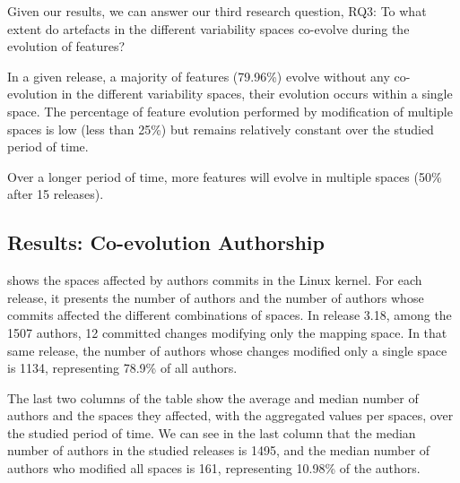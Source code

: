 Given our results, we can answer our third research question, RQ3: 
To what extent do artefacts in the different variability spaces co-evolve during the evolution of features?
\begin{framed}
In a given release, a majority of features  (79.96\%) evolve without any co-evolution in the different variability spaces, their evolution occurs within a single space.
The percentage of feature evolution performed by modification of multiple spaces is low (less than 25\%) but remains relatively constant over
the studied period of time.

Over a longer period of time, more features will evolve in multiple spaces (50\% after 15 releases).
\end{framed}

\subsection{Results: Co-evolution Authorship}

 shows the spaces affected by authors commits in the Linux kernel.
For each release, it presents the number of authors and the number of authors whose commits
affected the different combinations of spaces.
In release 3.18, among the 1507 authors, 12 committed changes modifying only the mapping space.
In that same release, the number of authors whose changes modified only a single space is 1134, 
representing 78.9\% of all authors.

The last two columns of the table show the average and median number of authors and the spaces they affected, with the aggregated values
per spaces, over the studied period of time.
We can see in the last column that the median number of authors in the studied releases is 1495,
and the median number of authors who modified all spaces is 161, representing 10.98\% of the authors.

